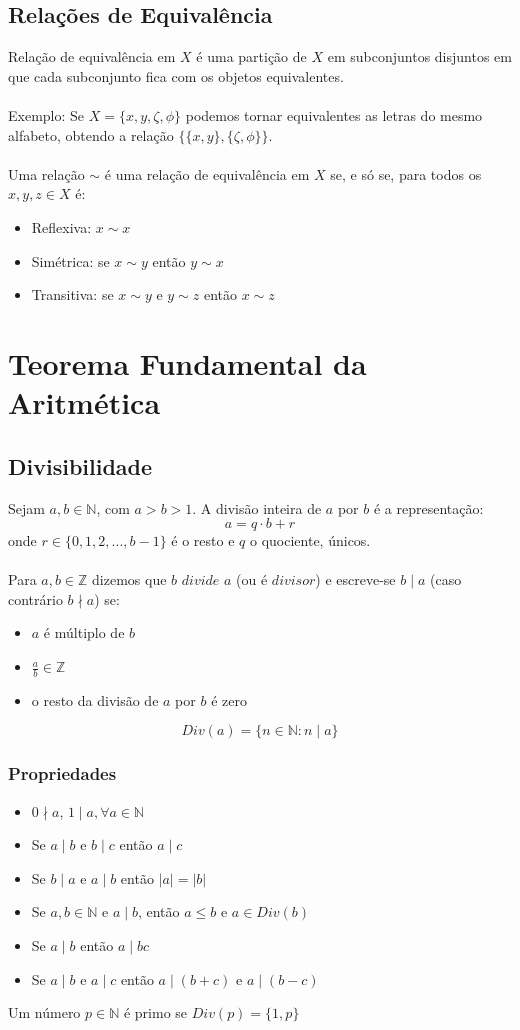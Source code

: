 \documentclass[10pt,a4paper]{report}
\begin{document}
\subsection{Relações de Equivalência}
Relação de equivalência em $X$ é uma partição de $X$ em subconjuntos disjuntos em que cada subconjunto fica com os objetos equivalentes.\\
\\
Exemplo: Se $X = \{x,y,\zeta,\phi\}$ podemos tornar equivalentes as letras do mesmo alfabeto, obtendo a relação $\{\{x,y\}, \{\zeta,\phi\}\}$.\\
\\
Uma relação $\sim$ é uma relação de equivalência em $X$ se, e só se, para todos os $x, y, z \in X$ é:
\begin{itemize}
\item Reflexiva: $x \sim x$
\item Simétrica: se $x \sim y$ então $y \sim x$
\item Transitiva: se $x \sim y$ e $y \sim z$ então $x \sim z$
\end{itemize}
\section{Teorema Fundamental da Aritmética}
\subsection{Divisibilidade}
Sejam $a, b \in \mathbb{N}$, com $a > b > 1$. A divisão inteira de $a$ por $b$ é a representação:
$$
a = q \cdot b + r
$$
onde $r \in \{0, 1, 2, ..., b-1\}$ é o resto e $q$ o quociente, únicos.\\
\\
Para $a, b \in \mathbb{Z}$ dizemos que $b$ $divide$ $a$ (ou é $divisor$) e escreve-se $b \mid a$ (caso contrário $b \nmid a$) se:
\begin{itemize}
\item $a$ é múltiplo de $b$
\item $\frac{a}{b} \in \mathbb{Z}$
\item o resto da divisão de $a$ por $b$ é zero
\end{itemize}
$$
Div(a) = \{n \in \mathbb{N} : n \mid a \}
$$
\subsubsection{Propriedades}
\begin{itemize}
\item $0 \nmid a$, $1 \mid a, \forall a \in \mathbb{N}$
\item Se $a \mid b$ e $b \mid c$ então $a \mid c$
\item Se $b \mid a$ e $a \mid b$ então $|a| = |b|$
\item Se $a, b \in \mathbb{N}$ e $a \mid b$, então $a \leq b$ e $a \in Div(b)$
\item Se $a \mid b$ então $a \mid bc$
\item Se $a \mid b$ e $a \mid c$ então $a \mid (b+c)$ e $a \mid (b-c)$
\end{itemize}
Um número $p \in \mathbb{N}$ é primo se $Div(p) = \{1,p\}$
\end{document}
